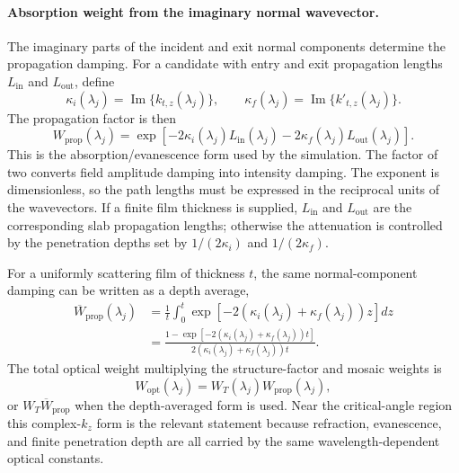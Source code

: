 \documentclass[11pt]{article}
\begin{document}
\paragraph{Absorption weight from the imaginary normal wavevector.}
The imaginary parts of the incident and exit normal components determine the propagation damping.
For a candidate with entry and exit propagation lengths $L_{\mathrm{in}}$ and $L_{\mathrm{out}}$,
define
\begin{equation}
  \kappa_i(\lambda_j)=\operatorname{Im}\{k_{t,z}(\lambda_j)\},
  \qquad
  \kappa_f(\lambda_j)=\operatorname{Im}\{k'_{t,z}(\lambda_j)\}.
  \label{eq:si_kappa_if_lambda}
\end{equation}
The propagation factor is then
\begin{equation}
  W_{\mathrm{prop}}(\lambda_j)
  =
  \exp\!\left[
  -2\kappa_i(\lambda_j)L_{\mathrm{in}}(\lambda_j)
  -2\kappa_f(\lambda_j)L_{\mathrm{out}}(\lambda_j)
  \right].
  \label{eq:si_imkz_pathlength_weight}
\end{equation}
This is the absorption/evanescence form used by the simulation. The factor of two converts field
amplitude damping into intensity damping. The exponent is dimensionless, so the path lengths must
be expressed in the reciprocal units of the wavevectors. If a finite film thickness is supplied,
$L_{\mathrm{in}}$ and $L_{\mathrm{out}}$ are the corresponding slab propagation lengths; otherwise the
attenuation is controlled by the penetration depths set by $1/(2\kappa_i)$ and $1/(2\kappa_f)$.

For a uniformly scattering film of thickness $t$, the same normal-component damping can be written
as a depth average,
\begin{align}
  \overline W_{\mathrm{prop}}(\lambda_j)
  &=
  \frac{1}{t}\int_0^t
  \exp\!\left[-2\left(\kappa_i(\lambda_j)+\kappa_f(\lambda_j)\right)z\right] dz\\
  &=
  \frac{
  1-\exp\!\left[-2\left(\kappa_i(\lambda_j)+\kappa_f(\lambda_j)\right)t\right]
  }
  {2\left(\kappa_i(\lambda_j)+\kappa_f(\lambda_j)\right)t}.
  \label{eq:si_abs_complex_kz}
\end{align}
The total optical weight multiplying the structure-factor and mosaic weights is
\begin{equation}
  W_{\mathrm{opt}}(\lambda_j)=W_T(\lambda_j)W_{\mathrm{prop}}(\lambda_j),
  \label{eq:si_full_optical_weight_lambda}
\end{equation}
or $W_T\overline W_{\mathrm{prop}}$ when the depth-averaged form is used. Near the critical-angle
region this complex-$k_z$ form is the relevant statement because refraction, evanescence, and
finite penetration depth are all carried by the same wavelength-dependent optical constants.
\end{document}
